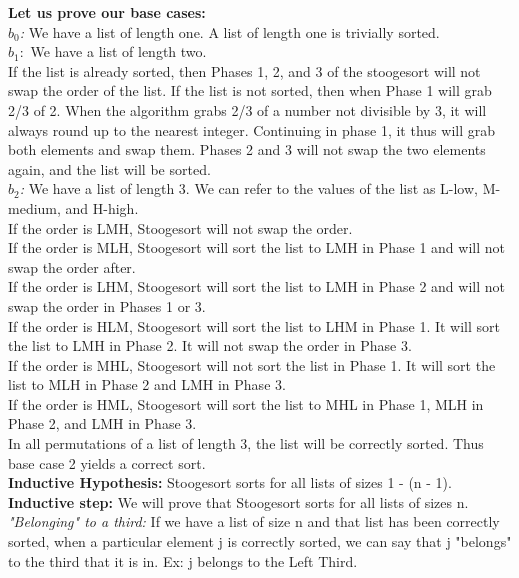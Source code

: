 \documentclass[11pt, solution, letterpaper]{format}
\begin{document}
\textbf{Let us prove our base cases:} \\
 \emph{$b_0$:} We have a list of length one. A list of length one is trivially sorted.\\
 \emph{$b_1:$} We have a list of length two. \\
If the list is already sorted, then Phases 1, 2, and 3 of the stoogesort will not swap the order of the list. If the list is not sorted, then when Phase 1 will grab 2/3 of 2. When the algorithm grabs 2/3 of a number not divisible by 3, it will always round up to the nearest integer. Continuing in phase 1, it thus will grab both elements and swap them. Phases 2 and 3 will not swap the two elements again, and the list will be sorted.\\
\emph{$b_2$:} We have a list of length 3. We can refer to the values of the list as L-low, M-medium, and H-high.\\
If the order is LMH, Stoogesort will not swap the order.\\
If the order is MLH, Stoogesort will sort the list to LMH in Phase 1 and will not swap the order after.\\
If the order is LHM, Stoogesort will sort the list to LMH in Phase 2 and will not swap the order in Phases 1 or 3.\\
If the order is HLM, Stoogesort will sort the list to LHM in Phase 1. It will sort the list to LMH in Phase 2. It will not swap the order in Phase 3. \\
If the order is MHL, Stoogesort will not sort the list in Phase 1. It will sort the list to MLH in Phase 2 and LMH in Phase 3.\\
If the order is HML, Stoogesort will sort the list to MHL in Phase 1, MLH in Phase 2, and LMH in Phase 3. \\
In all permutations of a list of length 3, the list will be correctly sorted. Thus base case 2 yields a correct sort. \\

\textbf{Inductive Hypothesis:} Stoogesort sorts for all lists of sizes 1 - (n - 1).\\
\textbf{Inductive step:} We will prove that Stoogesort sorts for all lists of sizes n.\\


\emph{"Belonging" to a third:} If we have a list of size n and that list has been correctly sorted, when a particular element j is correctly sorted, we can say that j "belongs" to the third that it is in. Ex: j belongs to the Left Third.  \\
\end{document}
